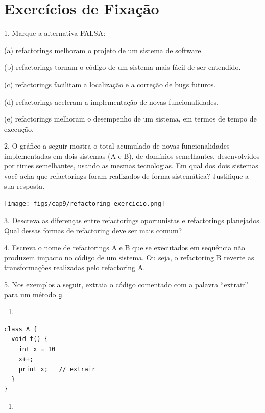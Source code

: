 \documentclass[
  11pt,
  twoside]{book}
\newcommand{\passthrough}[1]{#1}
\providecommand{\tightlist}{%
  \setlength{\itemsep}{0pt}\setlength{\parskip}{0pt}}
\begin{document}
\hypertarget{exercuxedcios-de-fixauxe7uxe3o-8}{%
\section*{Exercícios de
Fixação}\label{exercuxedcios-de-fixauxe7uxe3o-8}}

1. Marque a alternativa FALSA:

(a) refactorings melhoram o projeto de um sistema de software.

(b) refactorings tornam o código de um sistema mais fácil de ser
entendido.

(c) refactorings facilitam a localização e a correção de bugs futuros.

(d) refactorings aceleram a implementação de novas funcionalidades.

(e) refactorings melhoram o desempenho de um sistema, em termos de tempo
de execução.

2. O gráfico a seguir mostra o total acumulado de novas funcionalidades
implementadas em dois sistemas (A e B), de domínios semelhantes,
desenvolvidos por times semelhantes, usando as mesmas tecnologias. Em
qual dos dois sistemas você acha que refactorings foram realizados de
forma sistemática? Justifique a sua resposta.

\texttt{[image: figs/cap9/refactoring-exercicio.png]}

3. Descreva as diferenças entre refactorings oportunistas e refactorings
planejados. Qual dessas formas de refactoring deve ser mais comum?

4. Escreva o nome de refactorings A e B que se executados em sequência
não produzem impacto no código de um sistema. Ou seja, o refactoring B
reverte as transformações realizadas pelo refactoring A.

5. Nos exemplos a seguir, extraia o código comentado com a palavra
``extrair'' para um método \passthrough{\lstinline!g!}.

\begin{enumerate}
\def\labelenumi{(\alph{enumi})}
\tightlist
\item
\end{enumerate}

\begin{lstlisting}
class A {
  void f() {
    int x = 10
    x++;      
    print x;   // extrair
  }
}
\end{lstlisting}

\begin{enumerate}
\def\labelenumi{(\alph{enumi})}
\setcounter{enumi}{1}
\tightlist
\item
\end{enumerate}
\end{document}
